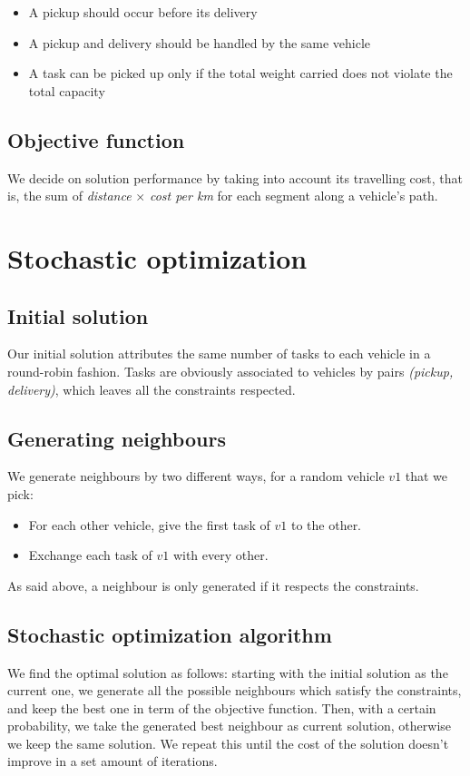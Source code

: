 \documentclass[11pt]{article}
\begin{document}
\begin{itemize}
	\item A pickup should occur before its delivery
	\item A pickup and delivery should be handled by the same vehicle
	\item A task can be picked up only if the total weight carried does not violate the total capacity
\end{itemize}

\subsection{Objective function}
We decide on solution performance by taking into account its travelling cost, that is, the sum of \textit{distance} $\times$ \textit{cost per km} for each segment along a vehicle's path. 


\section{Stochastic optimization}

\subsection{Initial solution}
Our initial solution attributes the same number of tasks to each vehicle in a round-robin fashion. Tasks are obviously associated to vehicles by pairs \textit{(pickup, delivery)}, which leaves all the constraints respected. 

\subsection{Generating neighbours}
We generate neighbours by two different ways, for a random vehicle $v1$ that we pick: 

\begin{itemize}
	\item For each other vehicle, give the first task of $v1$ to the other. 
	\item Exchange each task of $v1$ with every other. 
\end{itemize}

As said above, a neighbour is only generated if it respects the constraints.

\subsection{Stochastic optimization algorithm}
We find the optimal solution as follows: starting with the initial solution as the current one, we generate all the possible neighbours which satisfy the constraints, and keep the best one in term of the objective function. Then, with a certain probability, we take the generated best neighbour as current solution, otherwise we keep the same solution. We repeat this until the cost of the solution doesn't improve in a set amount of iterations. 
\end{document}
